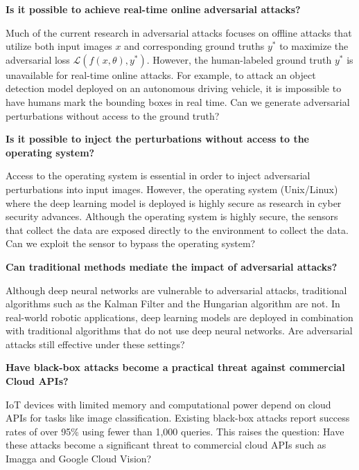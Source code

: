 \vspace{0.5cm}

\textbf{Is it possible to achieve real-time online adversarial attacks?}

Much of the current research in adversarial attacks focuses on offline attacks that utilize both input images $x$ and corresponding ground truths $y^*$ to maximize the adversarial loss $\mathcal{L}(f(x, \theta), y^*)$. However, the human-labeled ground truth $y^*$ is unavailable for real-time online attacks. For example, to attack an object detection model deployed on an autonomous driving vehicle, it is impossible to have humans mark the bounding boxes in real time. Can we generate adversarial perturbations without access to the ground truth?

\vspace{0.5cm}

\textbf{Is it possible to inject the perturbations without access to the operating system?}

Access to the operating system is essential in order to inject adversarial perturbations into input images. However, the operating system (Unix/Linux) where the deep learning model is deployed is highly secure as research in cyber security advances. Although the operating system is highly secure, the sensors that collect the data are exposed directly to the environment to collect the data. Can we exploit the sensor to bypass the operating system?

\vspace{0.5cm}

\textbf{Can traditional methods mediate the impact of adversarial attacks?}

Although deep neural networks are vulnerable to adversarial attacks, traditional algorithms such as the Kalman Filter and the Hungarian algorithm are not. In real-world robotic applications, deep learning models are deployed in combination with traditional algorithms that do not use deep neural networks. Are adversarial attacks still effective under these settings?

\vspace{0.5cm}

\textbf{Have black-box attacks become a practical threat against commercial Cloud APIs?}

IoT devices with limited memory and computational power depend on cloud APIs for tasks like image classification. Existing black-box attacks report success rates of over 95\% using fewer than 1,000 queries. This raises the question: Have these attacks become a significant threat to commercial cloud APIs such as Imagga and Google Cloud Vision?

